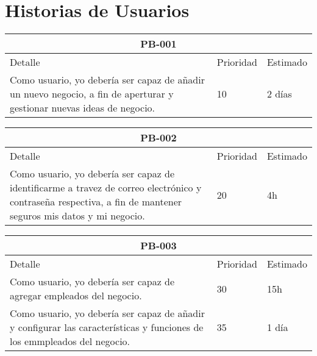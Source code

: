 \chapter{Historias de Usuarios}

\begin{table}[htbp]
	\begin{center}
		\begin{tabular}{|p{10cm} | p{2cm} | p{2cm}|}
			\hline
			\multicolumn{3}{|c|}{PB-001}\\
			\hline
			Detalle & Prioridad & Estimado \\
			\hline
			Como usuario, yo debería ser capaz de añadir un nuevo negocio, a fin de aperturar y gestionar nuevas ideas de negocio. & 10 & 2 días \\
			\hline	
		\end{tabular}
	\end{center}
\end{table}

\begin{table}[htbp]
	\begin{center}
		\begin{tabular}{|p{10cm} | p{2cm} | p{2cm}|}
			\hline
			\multicolumn{3}{|c|}{PB-002}\\
			\hline
			Detalle & Prioridad & Estimado \\
			\hline
			Como usuario, yo debería ser capaz de identificarme a travez de correo electrónico y contraseña respectiva, a fin de mantener seguros mis datos y mi negocio.  & 20 & 4h \\
			\hline	
		\end{tabular}
	\end{center}
\end{table}

\begin{table}[htbp]
	\begin{center}
		\begin{tabular}{|p{10cm} | p{2cm} | p{2cm}|}
			\hline
			\multicolumn{3}{|c|}{PB-003}\\
			\hline
			Detalle & Prioridad & Estimado \\
			\hline
			Como usuario, yo debería ser capaz de agregar empleados del negocio.& 30 & 15h \\
			\hline
			Como usuario, yo debería ser capaz de añadir y configurar las características y funciones de los emmpleados del negocio.& 35 & 1 día \\
			\hline	
		\end{tabular}
	\end{center}
\end{table}

